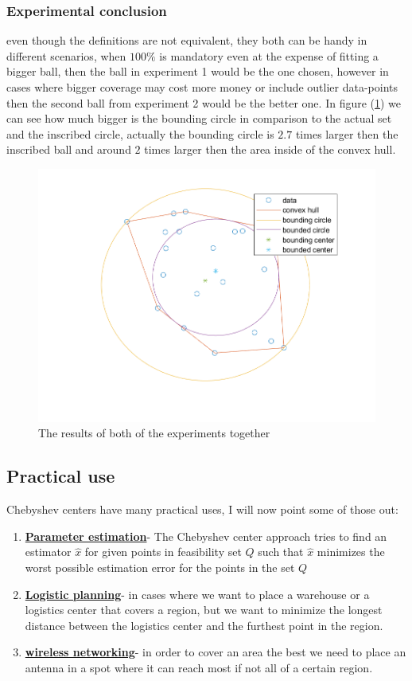 \documentclass[]{article}
\newcommand{\Q}[0]{\textit{Q}}
\begin{document}
\subsubsection{Experimental conclusion}
even though the definitions are not equivalent, they both can be handy in different scenarios, when $100\%$ is mandatory even at the expense of fitting a bigger ball, then the ball in experiment 1 would be the one chosen, however in cases where bigger coverage may cost more money or include outlier data-points then the second ball from experiment 2 would be the better one.
In figure (\ref{both}) we can see how much bigger is the bounding circle in comparison to the actual set and the inscribed circle, actually the bounding circle is $2.7$ times larger then the inscribed ball and around $2$ times larger then the area inside of the convex hull.

\begin{figure}[!h]
	\centering
	\includegraphics[width=\textwidth]{both}
	\caption{The results of both of the experiments together}
	\label{both}
\end{figure}

\subsection{Practical use}

Chebyshev centers have many practical uses, I will now point some of those out:
\begin{enumerate}
	\item \underline{\textbf{Parameter estimation}}- The Chebyshev center approach tries to find an estimator $\hat{x}$ for given points in feasibility set $\Q$ such that $\hat{x}$ minimizes the worst possible estimation error for the points in the set $\Q$
	\item \underline{\textbf{Logistic planning}}- in cases where we want to place a warehouse or a logistics center that covers a region, but we want to minimize the longest distance between the logistics center and the furthest point in the region.
	\item \underline{\textbf{wireless networking}}- in order to cover an area the best we need to place an antenna in a spot where it can reach most if not all of a certain region.
\end{enumerate}
\end{document}
